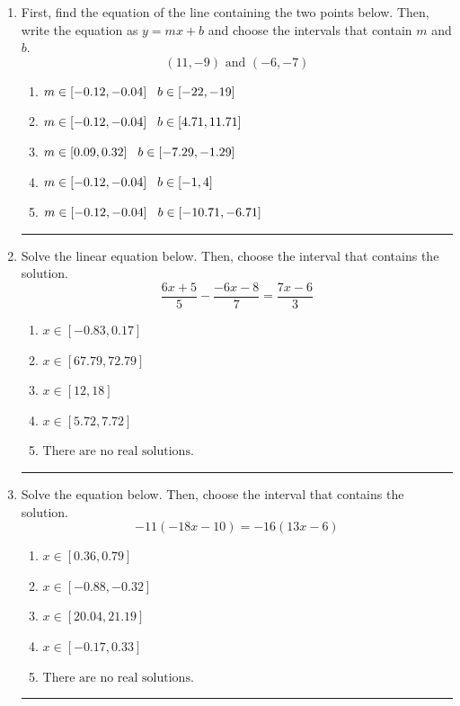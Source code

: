 \documentclass[14pt]{extbook}
\newcommand{\litem}[1]{\item#1\hspace*{-1cm}\rule{\textwidth}{0.4pt}}
\begin{document}
\begin{enumerate}
{\begin{enumerate}[label=\Alph*.]
\end{enumerate} }
\litem{
First, find the equation of the line containing the two points below. Then, write the equation as $ y=mx+b $ and choose the intervals that contain $m$ and $b$.\[ (11, -9) \text{ and } (-6, -7) \]\begin{enumerate}[label=\Alph*.]
\item \( m \in [-0.12, -0.04] \hspace*{3mm} b \in [-22, -19] \)
\item \( m \in [-0.12, -0.04] \hspace*{3mm} b \in [4.71, 11.71] \)
\item \( m \in [0.09, 0.32] \hspace*{3mm} b \in [-7.29, -1.29] \)
\item \( m \in [-0.12, -0.04] \hspace*{3mm} b \in [-1, 4] \)
\item \( m \in [-0.12, -0.04] \hspace*{3mm} b \in [-10.71, -6.71] \)

\end{enumerate} }
\litem{
Solve the linear equation below. Then, choose the interval that contains the solution.\[ \frac{6x + 5}{5} - \frac{-6x -8}{7} = \frac{7x -6}{3} \]\begin{enumerate}[label=\Alph*.]
\item \( x \in [-0.83, 0.17] \)
\item \( x \in [67.79, 72.79] \)
\item \( x \in [12, 18] \)
\item \( x \in [5.72, 7.72] \)
\item \( \text{There are no real solutions.} \)

\end{enumerate} }
\litem{
Solve the equation below. Then, choose the interval that contains the solution.\[ -11(-18x -10) = -16(13x -6) \]\begin{enumerate}[label=\Alph*.]
\item \( x \in [0.36, 0.79] \)
\item \( x \in [-0.88, -0.32] \)
\item \( x \in [20.04, 21.19] \)
\item \( x \in [-0.17, 0.33] \)
\item \( \text{There are no real solutions.} \)


\end{enumerate}}
\end{enumerate}
\end{document}
